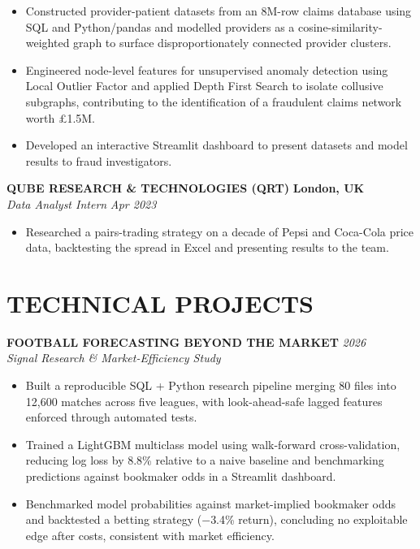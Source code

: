 \documentclass[10pt,a4paper]{article}
\begin{document}
\begin{itemize}
    \item Constructed provider-patient datasets from an 8M-row claims database using SQL and Python/pandas and modelled providers as a cosine-similarity-weighted graph to surface disproportionately connected provider clusters.

    \item Engineered node-level features for unsupervised anomaly detection using Local Outlier Factor and applied Depth First Search to isolate collusive subgraphs, contributing to the identification of a fraudulent claims network worth \pounds{}1.5M.

    \item Developed an interactive Streamlit dashboard to present datasets and model results to fraud investigators.
\end{itemize}

\textbf{QUBE RESEARCH \& TECHNOLOGIES (QRT)} \hfill \textbf{London, UK}\\
\textit{Data Analyst Intern} \hfill \textit{Apr 2023}

\begin{itemize}
    \item Researched a pairs-trading strategy on a decade of Pepsi and Coca-Cola price data, backtesting the spread in Excel and presenting results to the team.
\end{itemize}


\section*{TECHNICAL PROJECTS}

\textbf{FOOTBALL FORECASTING BEYOND THE MARKET} \hfill \textit{2026}\\
\textit{Signal Research \& Market-Efficiency Study}

\begin{itemize}
    \item Built a reproducible SQL + Python research pipeline merging 80 files into 12,600 matches across five leagues, with look-ahead-safe lagged features enforced through automated tests.

    \item Trained a LightGBM multiclass model using walk-forward cross-validation, reducing log loss by 8.8\% relative to a naive baseline and benchmarking predictions against bookmaker odds in a Streamlit dashboard.

    \item Benchmarked model probabilities against market-implied bookmaker odds and backtested a betting strategy ($-$3.4\% return), concluding no exploitable edge after costs, consistent with market efficiency.
\end{itemize}
\end{document}
